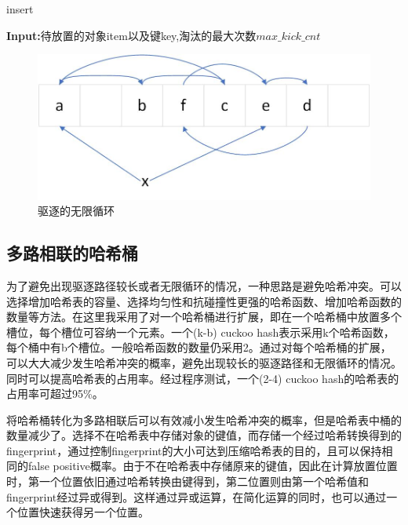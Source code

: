 \documentclass[supercite]{Experimental_Report}
\theoremstyle{definition}
\begin{document}
\begin{algorithm}[h]
	\caption{insert}
    {\bf Input:}待放置的对象item以及键key,淘汰的最大次数$max\_kick\_cnt$
	\begin{algorithmic}[1]
        \Else
            \EndWhile
        \EndIf
	\end{algorithmic}\label{alg:2}
\end{algorithm}


\begin{figure}[htb]
	\begin{center}
		\includegraphics[scale=0.7]{./images/kick_cycle.jpg}
		\caption{驱逐的无限循环}
		\label{fig2-2}
	\end{center}
\end{figure}

\subsection{多路相联的哈希桶}
为了避免出现驱逐路径较长或者无限循环的情况，一种思路是避免哈希冲突。可以选择增加哈希表的容量、选择均匀性和抗碰撞性更强的哈希函数、增加哈希函数的数量等方法。在这里我采用了对一个哈希桶进行扩展，即在一个哈希桶中放置多个槽位，每个槽位可容纳一个元素。一个(k-b) cuckoo hash表示采用k个哈希函数，每个桶中有b个槽位。一般哈希函数的数量仍采用2。通过对每个哈希桶的扩展，可以大大减少发生哈希冲突的概率，避免出现较长的驱逐路径和无限循环的情况。同时可以提高哈希表的占用率。经过程序测试，一个(2-4) cuckoo hash的哈希表的占用率可超过95\%。

将哈希桶转化为多路相联后可以有效减小发生哈希冲突的概率，但是哈希表中桶的数量减少了。选择不在哈希表中存储对象的键值，而存储一个经过哈希转换得到的fingerprint，通过控制fingerprint的大小可达到压缩哈希表的目的，且可以保持相同的false positive概率。由于不在哈希表中存储原来的键值，因此在计算放置位置时，第一个位置依旧通过哈希转换由键得到，第二位置则由第一个哈希值和fingerprint经过异或得到。这样通过异或运算，在简化运算的同时，也可以通过一个位置快速获得另一个位置。
\end{document}
